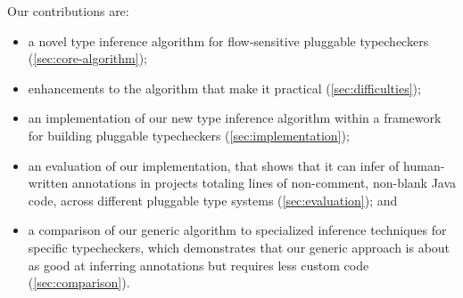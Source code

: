 Our contributions are:
\begin{itemize}
\item a novel type inference algorithm for flow-sensitive pluggable
  typecheckers (\cref{sec:core-algorithm});
\item enhancements to the algorithm that
  make it practical (\cref{sec:difficulties});
\item an implementation of our new type inference algorithm within a framework
  for building pluggable typecheckers (\cref{sec:implementation});
\item an evaluation of our implementation, that shows that it can infer
  \percentInferred of human-written annotations in \numProjects projects totaling
  \numLOC lines of non-comment, non-blank Java code, across \numTypeSystems different
  pluggable type systems (\cref{sec:evaluation}); and
\item a comparison of our generic algorithm to specialized inference
  techniques for specific typecheckers, which demonstrates that our generic
  approach is about as good at inferring annotations but requires less
  custom code (\cref{sec:comparison}).
\end{itemize}

